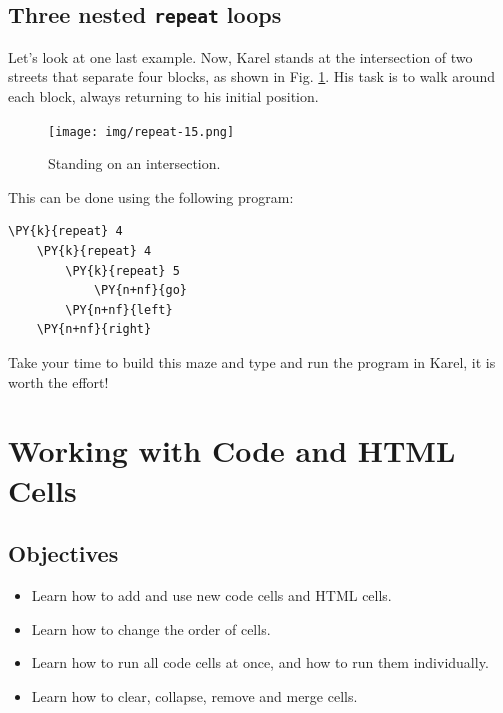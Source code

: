 \subsection{Three nested {\tt repeat} loops} \label{subsec:3rep}

Let's look at one last example. Now, Karel stands at the intersection of 
two streets that separate four blocks, as shown in Fig. \ref{fig:repeat-15}. His 
task is to walk around each block, always returning to his initial position.
\newpage

\begin{figure}[!ht]
\begin{center}
\texttt{[image: img/repeat-15.png]}
\vspace{-0mm}
\caption{Standing on an intersection.}
\label{fig:repeat-15}
\vspace{-0.6cm}
\end{center}
\end{figure}
\noindent
This can be done using the following program:\\

\begin{bbox}
\begin{Verbatim}[commandchars=\\\{\}]
\PY{k}{repeat} 4
    \PY{k}{repeat} 4
        \PY{k}{repeat} 5
            \PY{n+nf}{go}
        \PY{n+nf}{left}
    \PY{n+nf}{right}
\end{Verbatim}
\end{bbox}
\vspace{6mm}

\noindent
Take your time to build this maze and type and run the program in Karel, it is worth the effort!

\section{Working with Code and HTML Cells} \label{sec:editmenu}

\subsection{Objectives} 
 
\begin{itemize}
\item Learn how to add and use new code cells and HTML cells.
\item Learn how to change the order of cells.
\item Learn how to run all code cells at once, and how to run them individually.
\item Learn how to clear, collapse, remove and merge cells.
\end{itemize}

